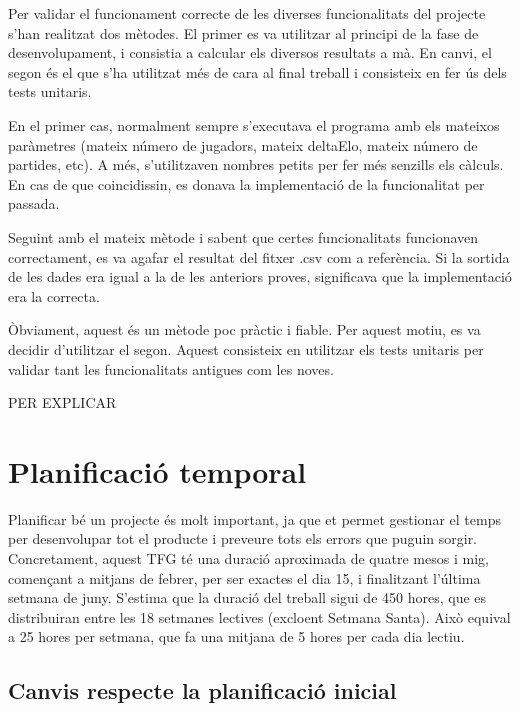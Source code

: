 \documentclass[a4paper]{article}
\begin{document}
Per validar el funcionament correcte de les diverses funcionalitats del projecte s'han realitzat dos mètodes. El primer es va utilitzar al principi de la fase de desenvolupament, i consistia a calcular els diversos resultats a mà. En canvi, el segon és el que s'ha utilitzat més de cara al final treball i consisteix en fer ús dels tests unitaris.

En el primer cas, normalment sempre s'executava el programa amb els mateixos paràmetres (mateix número de jugadors, mateix deltaElo, mateix número de partides, etc). A més, s'utilitzaven nombres petits per fer més senzills els càlculs. En cas de que coincidissin, es donava la implementació de la funcionalitat per passada.

Seguint amb el mateix mètode i sabent que certes funcionalitats funcionaven correctament, es va agafar el resultat del fitxer .csv com a referència. Si la sortida de les dades era igual a la de les anteriors proves, significava que la implementació era la correcta.

Òbviament, aquest és un mètode poc pràctic i fiable. Per aquest motiu, es va decidir d'utilitzar el segon. Aquest consisteix en utilitzar els tests unitaris per validar tant les funcionalitats antigues com les noves.

PER EXPLICAR

\newpage
\section{Planificació temporal}
Planificar bé un projecte és molt important, ja que et permet gestionar el temps per desenvolupar tot el producte i preveure tots els errors que puguin sorgir. Concretament, aquest TFG té una duració aproximada de quatre mesos i mig, començant a mitjans de febrer, per ser exactes el dia 15, i finalitzant l'última setmana de juny. S'estima que la duració del treball sigui de 450 hores, que es distribuiran entre les 18 setmanes lectives (excloent Setmana Santa). Això equival a 25 hores per setmana, que fa una mitjana de 5 hores per cada dia lectiu. 

\subsection{Canvis respecte la planificació inicial}
\end{document}
